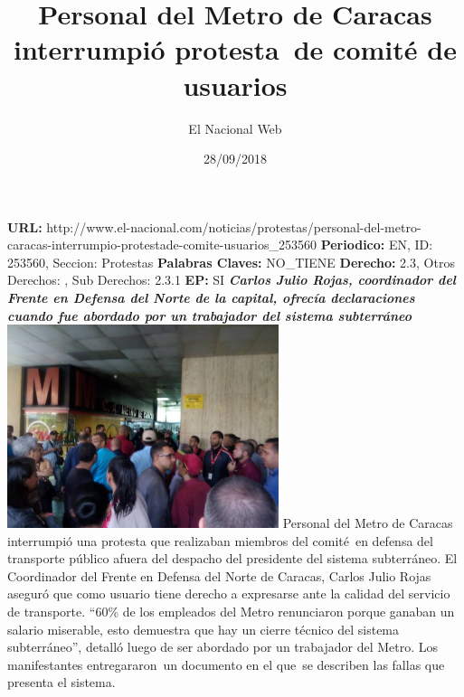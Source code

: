 \documentclass{article}%
\title{\textbf{Personal del Metro de Caracas interrumpió protesta~de comité de usuarios}}%
\author{El Nacional Web}%
\date{28/09/2018}%
\begin{document}
%
\normalsize%
\maketitle%
\textbf{URL: }%
http://www.el{-}nacional.com/noticias/protestas/personal{-}del{-}metro{-}caracas{-}interrumpio{-}protestade{-}comite{-}usuarios\_253560\newline%
%
\textbf{Periodico: }%
EN, %
ID: %
253560, %
Seccion: %
Protestas\newline%
%
\textbf{Palabras Claves: }%
NO\_TIENE\newline%
%
\textbf{Derecho: }%
2.3, %
Otros Derechos: %
, %
Sub Derechos: %
2.3.1\newline%
%
\textbf{EP: }%
SI\newline%
\newline%
%
\textbf{\textit{Carlos Julio Rojas, coordinador del Frente en Defensa del Norte de la capital, ofrecía declaraciones cuando fue abordado por un trabajador del sistema subterráneo}}%
\newline%
\newline%
%
\includegraphics[width=300px]{49.jpg}%
\newline%
%
Personal del Metro de Caracas interrumpió una protesta que realizaban miembros del comité~en defensa del transporte público afuera del despacho del presidente del sistema subterráneo.%
\newline%
%
El Coordinador del Frente en Defensa del Norte de Caracas, Carlos Julio Rojas aseguró que como usuario tiene derecho a expresarse ante la calidad del servicio de transporte.%
\newline%
%
“60\% de los empleados del Metro renunciaron porque ganaban un salario miserable, esto demuestra que hay un cierre técnico del sistema subterráneo”, detalló luego de ser abordado por un trabajador del Metro.%
\newline%
%
Los manifestantes entregararon~un documento en el que~se describen las fallas que presenta el sistema.%
\newline%
%
\end{document}
